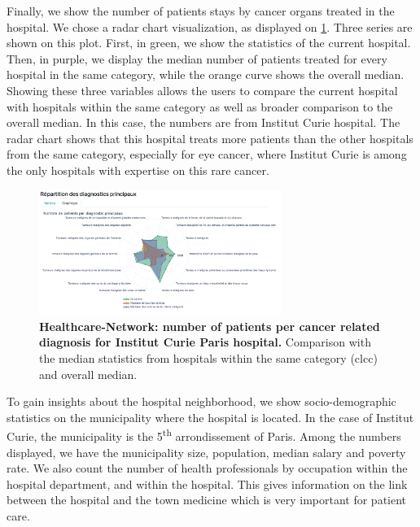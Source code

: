 Finally, we show the number of patients stays by cancer organs treated in the
hospital. We chose a radar chart visualization, as displayed on
\cref{fig:hn-curie-dp}. Three series are shown on this plot. First, in green, we
show the statistics of the current hospital. Then, in purple, we display the
median number of patients treated for every hospital in the same category, while
the orange curve shows the overall median. Showing these three variables allows
the users to compare the current hospital with hospitals within the same
category as well as broader comparison to the overall median. In this case, the
numbers are from Institut Curie hospital. The radar chart shows that this
hospital treats more patients than the other hospitals from the same category,
especially for eye cancer, where Institut Curie is among the only hospitals with
expertise on this rare cancer.

\begin{figure}[h]
    \includegraphics[width=0.7\textwidth]{images/healthcare-network/curie-dp.png}
    \centering
    \caption{ \textbf{Healthcare-Network: number of patients per cancer related
            diagnosis for Institut Curie Paris hospital.} Comparison with the median
        statistics from hospitals within the same category (\ac{clcc}) and
        overall median. }
    \label{fig:hn-curie-dp}
\end{figure}

To gain insights about the hospital neighborhood, we show socio-demographic
statistics on the municipality where the hospital is located. In the case of
Institut Curie, the municipality is the 5\textsuperscript{th} arrondissement of
Paris. Among the numbers displayed, we have the municipality size, population,
median salary and poverty rate. We also count the number of health professionals
by occupation within the hospital department, and within the hospital. This
gives information on the link between the hospital and the town medicine which
is very important for patient care.

